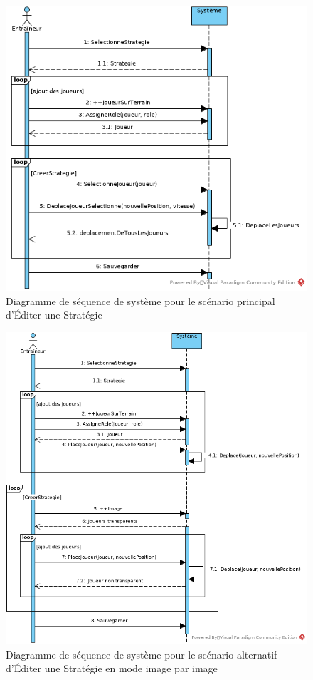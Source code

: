 \begin{figure}[htpb]
    \centering
    \includegraphics[scale=0.5]{fig/ssd_editer_strategie.png}
    \caption{Diagramme de séquence de système pour le scénario principal d'Éditer une Stratégie}
    \label{fig:ssd_sp_editer_strategie}
\end{figure}

\begin{figure}[htpb]
    \centering
    \includegraphics[scale=0.5]{fig/ssd_editer_strategie_ipi.png}
    \caption{Diagramme de séquence de système pour le scénario alternatif d'Éditer une Stratégie en mode image par image}
    \label{fig:ssd_sp_editer_strategie_ipi}
\end{figure}



